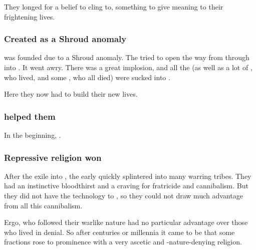 
They longed for a belief to cling to, something to give meaning to their frightening lives. 





\subsubsection{Created as a Shroud anomaly}
\Merkyrah{} was founded due to a Shroud anomaly. 
The \banes{} tried to open the way from \Erebos{} through \Nyx{} into \Tembrae. 
It went awry. 
There was a great implosion, and all the \resphain{} (as well as a lot of \nephilim, who lived, and some \humans{}, who all died) were sucked into \Nyx. 

Here they now had to build their new lives. 





\subsubsection{\Semiza helped them}
In the beginning, . 





\subsubsection{Repressive religion won}
After the exile into \Nyx, the early \resphain{} quickly splintered into many warring tribes. 
They had an instinctive bloodthirst and a craving for fratricide and cannibalism. 
But they did not have the technology to , so they could not draw much advantage from all this cannibalism. 

Ergo, \resphain{} who followed their warlike nature had no particular advantage over those who lived in denial. 
So after centuries or millennia it came to be that some fractions rose to prominence with a very ascetic and \resphan-nature-denying religion. 


